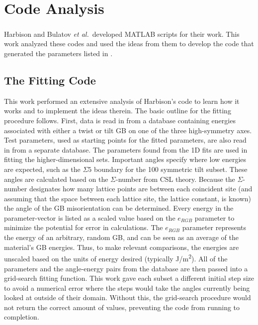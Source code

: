 \documentclass[twoside,senior]{BYUPhys}
\begin{document}
\section{Code Analysis\label{methods:code}}
Harbison\cite{harbison2015} and Bulatov \emph{et al.}\cite{bulatov2014}\ developed MATLAB\textsuperscript{\textregistered} scripts for their work.  This work analyzed these codes and used the ideas from them to develop the code that generated the parameters listed in .

\subsection{The Fitting Code\label{code:fitting}}
This work performed an extensive analysis of Harbison's code to learn how it works and to implement the ideas therein.  The basic outline for the fitting procedure follows.  First, data is read in from a database containing energies associated with either a twist or tilt GB on one of the three high-symmetry axes.  Test parameters, used as starting points for the fitted parameters, are also read in from a separate database.  The parameters found from the 1D fits are used in fitting the higher-dimensional sets.  Important angles specify where low energies are expected, such as the $\Sigma5$ boundary for the \textlangle{}100\textrangle{} symmetric tilt subset.  These angles are calculated based on the $\Sigma$-number from CSL theory. Because the $\Sigma$-number designates how many lattice points  are between each coincident site (and assuming that the space between each lattice site, the lattice constant, is known) the angle of the GB misorientation can be determined.  Every energy in the parameter-vector is listed as a scaled value based on the $e_{RGB}$ parameter to minimize the potential for error in calculations. The $e_{RGB}$ parameter represents the energy of an arbitrary, random GB, and can be seen as an average of the material's GB energies.  Thus, to make relevant comparisons, the energies are unscaled based on the units of energy desired (typically J/m\textsuperscript{2}).  All of the parameters and the angle-energy pairs from the database are then passed into a grid-search fitting function.  This work gave each subset a different initial step size to avoid a numerical error where the steps would take the angles currently being looked at outside of their domain. Without this, the grid-search procedure would not return the correct amount of values, preventing the code from running to completion.
\end{document}
